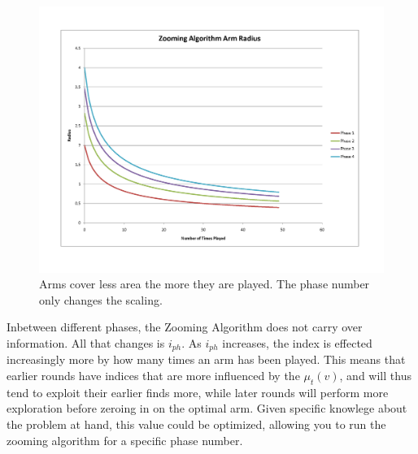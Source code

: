 \begin{figure}[!ht]
  \begin{center}
    \includegraphics[width=5 in]{figures/ZoomingRadius.png}
     \caption{Arms cover less area the more they are played. The phase
       number only changes the scaling.}
     \label{fig:zoomradius}
  \end{center}
\end{figure}

Inbetween different phases, the Zooming Algorithm does not carry over
information. All that changes is $i_{ph}$. As $i_{ph}$ increases, the
index is effected increasingly more by how many times an arm has been
played. This means that earlier rounds have indices that are more
influenced by the $\mu_t(v)$, and will thus tend to exploit their
earlier finds more, while later rounds will perform more exploration
before zeroing in on the optimal arm. Given specific knowlege about
the problem at hand, this value could be optimized, allowing you to
run the zooming algorithm for a specific phase number.

